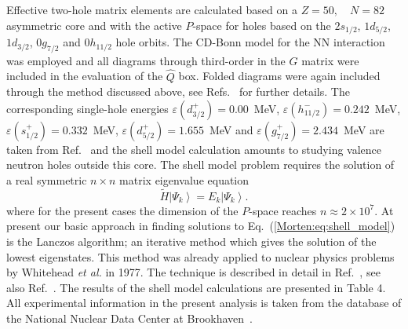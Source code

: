 Effective two-hole matrix elements are calculated based on 
a $Z = 50, \quad N = 82$ asymmetric core and 
with the active $P$-space for holes
based on the $2s_{1/2}$, $1d_{5/2}$, $1d_{3/2}$, $0g_{7/2}$ and $0h_{11/2}$
hole orbits. The CD-Bonn model for the NN interaction was employed
\cite{Morten:cdbonn} and all diagrams through third-order in the $G$ matrix
were included in the evaluation of the $\hat{Q}$ box. Folded diagrams
were again included through the method discussed above, see
Refs.~ for further details.
The corresponding single-hole energies
$\varepsilon(d_{3/2}^{+}) = 0.00$~MeV, 
 $\varepsilon(h_{11/2}^{-}) = 0.242$~MeV, 
$\varepsilon(s_{1/2}^{+}) = 0.332$~MeV,
$\varepsilon(d_{5/2}^{+}) = 1.655$~MeV and  
$\varepsilon(g_{7/2}^{+}) = 2.434$~MeV
are taken from \mbox{Ref. \cite{Morten:jan}}
and the shell model calculation amounts to studying
valence neutron holes outside this core.
The shell model problem requires the solution of a real symmetric
$n \times n$ matrix eigenvalue equation
\begin{equation}
       \widetilde{H}\left | \Psi_k\right\rangle  = 
       E_k \left | \Psi_k\right\rangle .
       \label{Morten:eq:shell_model}
\end{equation}
where for the present cases the dimension of 
the $P$-space reaches $n \approx 2 \times 10^{7}$.
At present our basic approach in finding 
solutions to Eq.~(\ref{Morten:eq:shell_model})
is the Lanczos algorithm; an iterative method
which gives the solution of the lowest eigenstates. This method was 
already applied to nuclear physics problems by Whitehead \emph{et al.}
in 1977. The technique is described in detail in Ref.~,
see also Ref.~.
The results of the shell model calculations are presented in Table 4.
All experimental information in the present analysis is taken 
from the database of the 
National Nuclear Data Center at \mbox{Brookhaven \cite{Morten:brook}}. 

